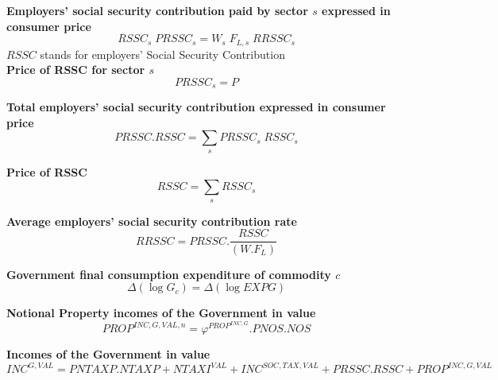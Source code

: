 \documentclass[12pt]{article}
\numberwithin{equation}{section}
\begin{document}
\noindent\textbf{Employers' social security contribution paid by sector $s$ expressed in consumer price} \\
\begin{dmath}
RSSC_{s} \; PRSSC_{s} = W_{s} \; F_{L, s} \; RRSSC_{s}
\end{dmath}
$RSSC$ stands for employers' Social Security Contribution \\

\noindent\textbf{Price of RSSC for sector $s$} \\
\begin{dmath}
PRSSC_{s} = P
\end{dmath}

\noindent\textbf{Total employers' social security contribution expressed in consumer price} \\
\begin{dmath}
PRSSC . RSSC = \sum_{s} PRSSC_{s} \; RSSC_{s}
\end{dmath}

\noindent\textbf{Price of RSSC} \\
\begin{dmath}
RSSC = \sum_{s} RSSC_{s}
\end{dmath}

\noindent\textbf{Average employers' social security contribution rate} \\
\begin{dmath}
RRSSC = PRSSC . \frac{RSSC}{\left( W . F_{L} \right)}
\end{dmath}

\noindent\textbf{ Government final consumption expenditure of commodity $c$} \\
\begin{dmath}
\varDelta \left(\operatorname{log} G_{c}\right) = \varDelta \left(\operatorname{log} EXPG\right)
\end{dmath}

\noindent\textbf{Notional Property incomes of the Government in value} \\
\begin{dmath}
PROP^{INC,G,VAL,n} = \varphi^{PROP^{INC,G}} . PNOS . NOS
\end{dmath}

\noindent\textbf{Incomes of the Government in value} \\
\begin{dmath}
INC^{G,VAL} = PNTAXP . NTAXP + NTAXI^{VAL} + INC^{SOC,TAX,VAL} + PRSSC . RSSC + PROP^{INC,G,VAL}
\end{dmath}
\end{document}
